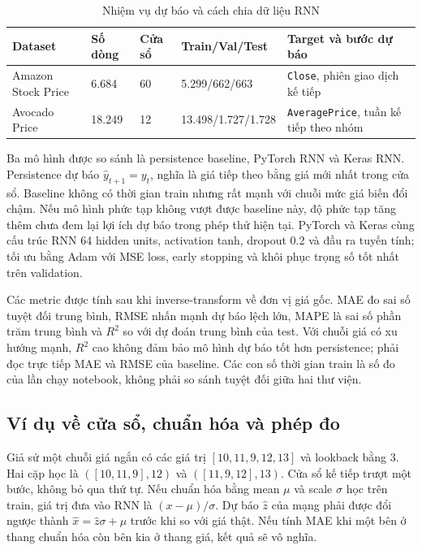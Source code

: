 \documentclass[12pt,a4paper]{report}
\begin{document}
\begin{table}[htbp]\centering\caption{Nhiệm vụ dự báo và cách chia dữ liệu RNN}\label{tab:rnn-split}
\footnotesize\begin{tabularx}{\textwidth}{p{2.5cm}p{1.3cm}p{1.3cm}p{3cm}X}
\toprule\textbf{Dataset} & \textbf{Số dòng} & \textbf{Cửa sổ} & \textbf{Train/Val/Test} & \textbf{Target và bước dự báo}\\\midrule
Amazon Stock Price & 6.684 & 60 & 5.299/662/663 & \texttt{Close}, phiên giao dịch kế tiếp\\
Avocado Price & 18.249 & 12 & 13.498/1.727/1.728 & \texttt{AveragePrice}, tuần kế tiếp theo nhóm\\
\bottomrule\end{tabularx}\end{table}

Ba mô hình được so sánh là persistence baseline, PyTorch RNN và Keras RNN. Persistence dự báo $\hat y_{t+1}=y_t$, nghĩa là giá tiếp theo bằng giá mới nhất trong cửa sổ. Baseline không có thời gian train nhưng rất mạnh với chuỗi mức giá biến đổi chậm. Nếu mô hình phức tạp không vượt được baseline này, độ phức tạp tăng thêm chưa đem lại lợi ích dự báo trong phép thử hiện tại. PyTorch và Keras cùng cấu trúc RNN 64 hidden units, activation tanh, dropout 0.2 và đầu ra tuyến tính; tối ưu bằng Adam với MSE loss, early stopping và khôi phục trọng số tốt nhất trên validation.

Các metric được tính sau khi inverse-transform về đơn vị giá gốc. MAE đo sai số tuyệt đối trung bình, RMSE nhấn mạnh dự báo lệch lớn, MAPE là sai số phần trăm trung bình và $R^2$ so với dự đoán trung bình của test. Với chuỗi giá có xu hướng mạnh, $R^2$ cao không đảm bảo mô hình dự báo tốt hơn persistence; phải đọc trực tiếp MAE và RMSE của baseline. Các con số thời gian train là số đo của lần chạy notebook, không phải so sánh tuyệt đối giữa hai thư viện.

\subsection{Ví dụ về cửa sổ, chuẩn hóa và phép đo}
Giả sử một chuỗi giá ngắn có các giá trị $[10,11,9,12,13]$ và lookback bằng 3. Hai cặp học là $([10,11,9],12)$ và $([11,9,12],13)$. Cửa sổ kế tiếp trượt một bước, không bỏ qua thứ tự. Nếu chuẩn hóa bằng mean $\mu$ và scale $\sigma$ học trên train, giá trị đưa vào RNN là $(x-\mu)/\sigma$. Dự báo $\hat z$ của mạng phải được đổi ngược thành $\hat x=\hat z\sigma+\mu$ trước khi so với giá thật. Nếu tính MAE khi một bên ở thang chuẩn hóa còn bên kia ở thang giá, kết quả sẽ vô nghĩa.
\end{document}
